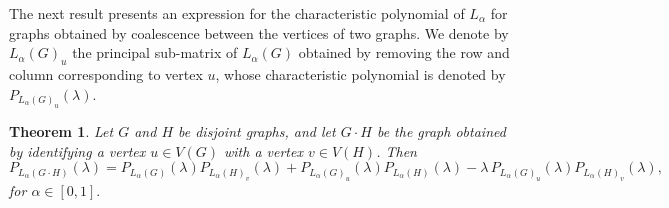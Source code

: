 \documentclass{article}
\newtheorem{theorem}{Theorem}[section]
\begin{document}
The next result presents an expression for the characteristic polynomial of $L_\alpha$ for graphs obtained by coalescence between the vertices of two graphs. We denote by $L_\alpha(G)_u$ the principal sub-matrix of $L_\alpha(G)$ obtained by removing the row and column corresponding to vertex $u$, whose characteristic polynomial is denoted by $P_{L_\alpha(G)_u}(\lambda)$.

\begin{theorem}\label{thm:coalescence}
Let $G$ and $H$ be disjoint graphs, and let $G\cdot H$ be the graph obtained by identifying a vertex $u \in V(G)$ with a vertex $v \in V(H)$. Then
\[
P_{L_{\alpha}(G\cdot H)}(\lambda)
=
P_{L_{\alpha}(G)}(\lambda)P_{L_{\alpha}(H)_v}(\lambda)
+
P_{L_{\alpha}(G)_u}(\lambda)P_{L_{\alpha}(H)}(\lambda)
-
\lambda\,P_{L_{\alpha}(G)_u}(\lambda)P_{L_{\alpha}(H)_v}(\lambda),
\]
for $\alpha \in [0,1].$
\end{theorem}
\end{document}

